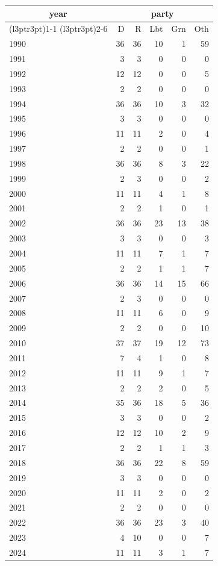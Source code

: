 \footnotesize\begin{tabular}[t]{lrrrrr}
\toprule
\multicolumn{1}{c}{year} & \multicolumn{5}{c}{party} \\
\cmidrule(l{3pt}r{3pt}){1-1} \cmidrule(l{3pt}r{3pt}){2-6}
  & D & R & Lbt & Grn & Oth\\
\midrule
1990 & 36 & 36 & 10 & 1 & 59\\
1991 & 3 & 3 & 0 & 0 & 0\\
1992 & 12 & 12 & 0 & 0 & 5\\
1993 & 2 & 2 & 0 & 0 & 0\\
1994 & 36 & 36 & 10 & 3 & 32\\
1995 & 3 & 3 & 0 & 0 & 0\\
1996 & 11 & 11 & 2 & 0 & 4\\
1997 & 2 & 2 & 0 & 0 & 1\\
1998 & 36 & 36 & 8 & 3 & 22\\
1999 & 2 & 3 & 0 & 0 & 2\\
2000 & 11 & 11 & 4 & 1 & 8\\
2001 & 2 & 2 & 1 & 0 & 1\\
2002 & 36 & 36 & 23 & 13 & 38\\
2003 & 3 & 3 & 0 & 0 & 3\\
2004 & 11 & 11 & 7 & 1 & 7\\
2005 & 2 & 2 & 1 & 1 & 7\\
2006 & 36 & 36 & 14 & 15 & 66\\
2007 & 2 & 3 & 0 & 0 & 0\\
2008 & 11 & 11 & 6 & 0 & 9\\
2009 & 2 & 2 & 0 & 0 & 10\\
2010 & 37 & 37 & 19 & 12 & 73\\
2011 & 7 & 4 & 1 & 0 & 8\\
2012 & 11 & 11 & 9 & 1 & 7\\
2013 & 2 & 2 & 2 & 0 & 5\\
2014 & 35 & 36 & 18 & 5 & 36\\
2015 & 3 & 3 & 0 & 0 & 2\\
2016 & 12 & 12 & 10 & 2 & 9\\
2017 & 2 & 2 & 1 & 1 & 3\\
2018 & 36 & 36 & 22 & 8 & 59\\
2019 & 3 & 3 & 0 & 0 & 0\\
2020 & 11 & 11 & 2 & 0 & 2\\
2021 & 2 & 2 & 0 & 0 & 0\\
2022 & 36 & 36 & 23 & 3 & 40\\
2023 & 4 & 10 & 0 & 0 & 7\\
2024 & 11 & 11 & 3 & 1 & 7\\
\bottomrule
\end{tabular}
